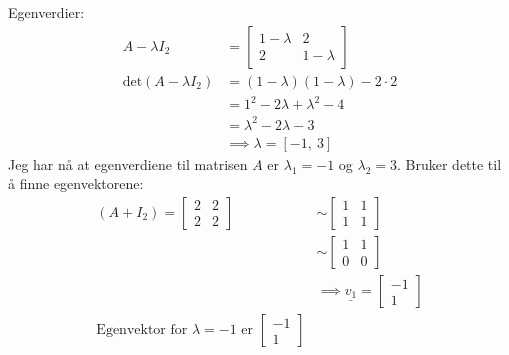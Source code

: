 \documentclass[11pt, a4paper, norsk]{NTNUoving}
\begin{document}
\begin{oppgave}
\begin{punkt}
            Egenverdier:
            \begin{align*}
                A - \lambda I_{2} &= \begin{bmatrix}
                    1 - \lambda & 2 \\
                    2 & 1 - \lambda
                \end{bmatrix}
                \\
                \text{det}(A - \lambda I_{2}) &= (1- \lambda)(1 - \lambda) - 2 \cdot 2
                \\
                                           &= 1^2 - 2\lambda + \lambda^2 - 4
                                           \\
                                           &= \lambda^2 - 2\lambda - 3
                                           \\
                                           &\implies \lambda = \left[ -1, \  3\right] 
            \end{align*}
            Jeg har nå at egenverdiene til matrisen $A$ er $\lambda_{1} = -1$ og $\lambda_2 = 3$. Bruker dette til å finne egenvektorene:
            \begin{align*}
                (A + I_{2}) = \begin{bmatrix}
                    2 & 2 \\
                    2 & 2
                \end{bmatrix} &\sim \begin{bmatrix}
                1 & 1 \\
                1 & 1 
                \end{bmatrix}
                \\
                &\sim \begin{bmatrix}
                    1 & 1 \\
                    0 & 0
                \end{bmatrix}
                \\
                &\implies \underline{v_1} = \begin{bmatrix}
                    -1 \\
                    1
                \end{bmatrix}
                \\
                \text{Egenvektor for } \lambda = -1 \text{ er } \begin{bmatrix}
                    -1 \\
                    1

\end{bmatrix}
\end{align*}
\end{punkt}
\end{oppgave}
\end{document}
